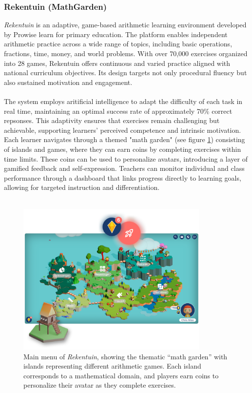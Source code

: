 \subsubsection{Rekentuin (MathGarden)}
\textit{Rekentuin} is an adaptive, game-based arithmetic learning environment developed by Prowise learn for primary education. The platform enables independent arithmetic practice across a wide range of topics, including basic operations, fractions, time, money, and world problems. With over 70,000 exercises organized into 28 games, Rekentuin offers continuous and varied practice aligned with national curriculum objectives. Its design targets not only procedural fluency but also sustained motivation and engagement. \\ \\
The system employs aritificial intelligence to adapt the difficulty of each task in real time, maintaining an optimal success rate of approximately 70\% correct repsonses. This adaptivity ensures that exercises remain challenging but achievable, supporting learners' perceived competence and intrinsic motivation. Each learner navigates through a themed "math garden" (see figure \ref{fig:rekentuin_menu}) consisting of islands and games, where they can earn coins by completing exercises within time limits. These coins can be used to personalize avatars, introducing a layer of gamified feedback and self-expression. Teachers can monitor individual and class performance through a dashboard that links progress directly to learning goals, allowing for targeted instruction and differentiation.\\ \\
\begin{figure}[H]
  \centering
  \includegraphics[width=0.85\textwidth]{figures/rekentuin.png}
  \caption[Main menu of \textit{Rekentuin}]
  {Main menu of \textit{Rekentuin}, showing the thematic “math garden” with islands representing different arithmetic games. 
  Each island corresponds to a mathematical domain, and players earn coins to personalize their avatar as they complete exercises.}
  \label{fig:rekentuin_menu}
\end{figure}
